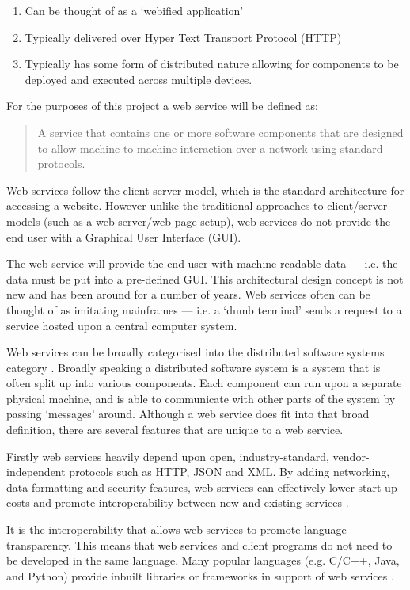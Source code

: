 \begin{enumerate}
  \item Can be thought of as a  `webified application'
  \item Typically delivered over Hyper Text Transport Protocol (HTTP)
  \item Typically has some form of distributed nature allowing for components 
  to be deployed and executed across multiple devices.
\end{enumerate}

For the purposes of this project a web service will be defined as:

\begin{quote}
  A service that contains one or more software components that are designed to 
  allow machine-to-machine interaction over a network using standard protocols.
\end{quote}

Web services follow the client-server model, which is the standard architecture
for accessing a website. However unlike the traditional approaches to 
client/server models (such as a web server/web page setup), web services do not
provide the end user with a Graphical User Interface (GUI).

The web service will provide the end user with machine readable data --- i.e. 
the data must be put into a pre-defined GUI. This architectural design concept 
is not new and has been around for a number of years. Web services often can be
thought of as imitating mainframes --- i.e. a `dumb terminal' sends a request 
to a service hosted upon a central computer system.

Web services can be broadly categorised into the distributed software systems 
category \citep{kalin13}. Broadly speaking a distributed software system is a 
system that is often split up into various components. Each component can run 
upon a separate physical machine, and is able to communicate with other parts 
of the system by passing `messages' around. Although a web service does fit 
into that broad definition, there are several features that are unique to a 
web service.

Firstly web services heavily depend upon open, industry-standard, 
vendor-independent protocols such as HTTP, JSON and XML. By adding networking, 
data formatting and security features, web services can effectively lower 
start-up costs and promote interoperability between new and existing services 
\citep{kalin13}.

It is the interoperability that allows web services to promote language 
transparency. This means that web services and client programs do not need to 
be developed in the same language. Many popular languages (e.g. C/C++, Java, and
Python) provide inbuilt libraries or frameworks in support of web services 
\citep{kalin13}.

